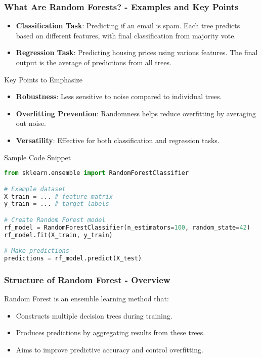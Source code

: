 \documentclass[aspectratio=169]{beamer}
\begin{document}
\begin{frame}[fragile]
  \frametitle{What Are Random Forests? - Examples and Key Points}
  \begin{itemize}
    \item \textbf{Classification Task}: Predicting if an email is spam. Each tree predicts based on different features, with final classification from majority vote.
    
    \item \textbf{Regression Task}: Predicting housing prices using various features. The final output is the average of predictions from all trees.
  \end{itemize}

  \begin{block}{Key Points to Emphasize}
    \begin{itemize}
      \item \textbf{Robustness}: Less sensitive to noise compared to individual trees.
      \item \textbf{Overfitting Prevention}: Randomness helps reduce overfitting by averaging out noise.
      \item \textbf{Versatility}: Effective for both classification and regression tasks.
    \end{itemize}
  \end{block}
  
  \begin{block}{Sample Code Snippet}
    \begin{lstlisting}[language=Python]
from sklearn.ensemble import RandomForestClassifier

# Example dataset
X_train = ... # feature matrix
y_train = ... # target labels

# Create Random Forest model
rf_model = RandomForestClassifier(n_estimators=100, random_state=42)
rf_model.fit(X_train, y_train)

# Make predictions
predictions = rf_model.predict(X_test)
    \end{lstlisting}
  \end{block}
\end{frame}

\begin{frame}[fragile]
    \frametitle{Structure of Random Forest - Overview}
    Random Forest is an ensemble learning method that:
    \begin{itemize}
        \item Constructs multiple decision trees during training.
        \item Produces predictions by aggregating results from these trees.
        \item Aims to improve predictive accuracy and control overfitting.
    \end{itemize}
\end{frame}
\end{document}
